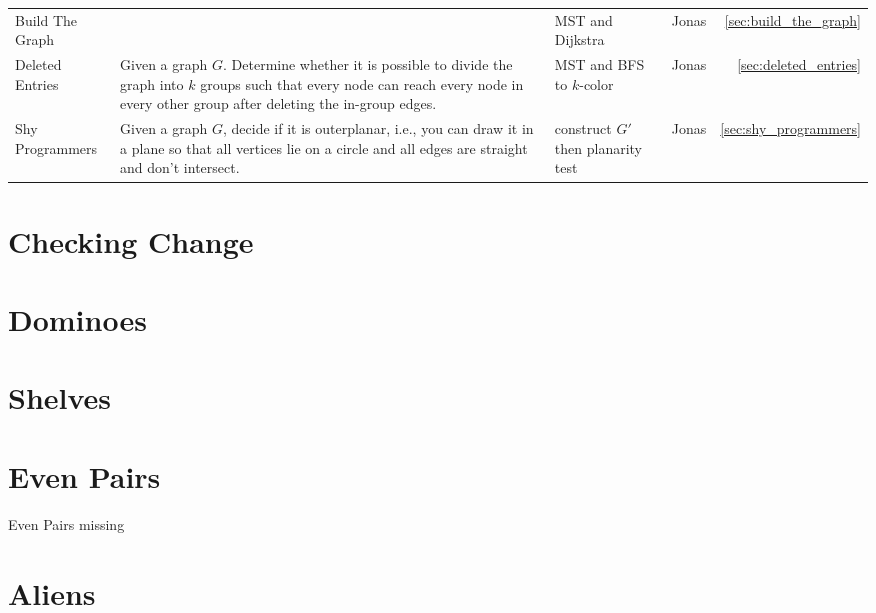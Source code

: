\documentclass[a4paper, 10pt]{article}
\let\stdsection\section
\renewcommand\section{\newpage\stdsection}
\newcommand{\includecode}[1]{
    }
\begin{document}
\begin{longtable}{ p{2cm} p{7cm} p{3cm} r r}
        Build The Graph 
        &          
        & MST and Dijkstra & Jonas & \ref{sec:build_the_graph} \\

        Deleted Entries 
        & Given a graph $G$. Determine whether it is possible to divide the graph into $k$ groups such that every node can reach every node in every other group
            after deleting the in-group edges.
        & MST and BFS to $k$-color & Jonas & \ref{sec:deleted_entries} \\

        Shy Programmers 
        & Given a graph $G$, decide if it is outerplanar, i.e., you can draw it in a plane so that all vertices lie on a 
            circle and all edges are straight and don't intersect.
        & construct $G'$ then planarity test & Jonas & \ref{sec:shy_programmers} \\

    \end{longtable}    

    
    \section{Checking Change}
        \includecode{../problems/w01/Checking_Change/CheckingChange1.cpp}
    
    \section{Dominoes}
        \includecode{../problems/w01/Dominoes/Dominoes1.cpp}
    
    \section{Shelves}
        \includecode{../problems/w01/Shelves/Shelves1.cpp}
        
    \section{Even Pairs}
        Even Pairs missing
    
    
    \section{Aliens}
        \includecode{../problems/w02/Aliens/Aliens1.cpp}
        
\end{document}
